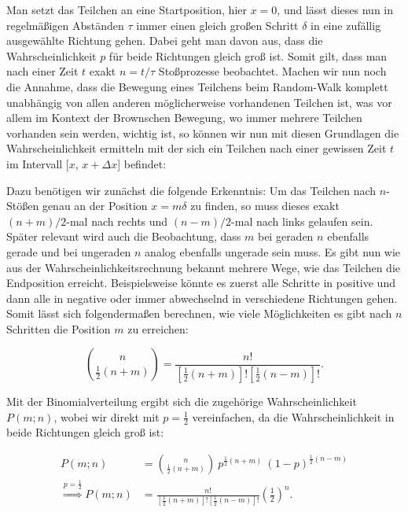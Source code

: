 \documentclass{article}
\begin{document}
Man setzt das Teilchen an eine Startposition, hier $x = 0$, und lässt dieses nun in regelmäßigen Abständen $\tau$ immer einen gleich großen Schritt $\delta$ in eine zufällig ausgewählte Richtung gehen. Dabei geht man davon aus, dass die Wahrscheinlichkeit $p$ für beide Richtungen gleich groß ist. Somit gilt, dass man nach einer Zeit $t$ exakt $n = t/\tau$ Stoßprozesse beobachtet. Machen wir nun noch die Annahme, dass die Bewegung eines Teilchens beim Random-Walk komplett unabhängig von allen anderen möglicherweise vorhandenen Teilchen ist, was vor allem im Kontext der Brownschen Bewegung, wo immer mehrere Teilchen vorhanden sein werden, wichtig ist, so können wir nun mit diesen Grundlagen die Wahrscheinlichkeit ermitteln mit der sich ein Teilchen nach einer gewissen Zeit $t$ im Intervall [$x$, $x+\Delta x$] befindet:

Dazu benötigen wir zunächst die folgende Erkenntnis: Um das Teilchen nach $n$-Stößen genau an der Position $x = m \delta$ zu finden, so muss dieses exakt $(n+m)/2$-mal nach rechts und $(n-m)/2$-mal nach links gelaufen sein. Später relevant wird auch die Beobachtung, dass $m$ bei geraden $n$ ebenfalls gerade und bei ungeraden $n$ analog ebenfalls ungerade sein muss. 
Es gibt nun wie aus der Wahrscheinlichkeitsrechnung bekannt mehrere Wege, wie das Teilchen die Endposition erreicht. Beispielsweise könnte es zuerst alle Schritte in positive und dann alle in negative oder immer abwechselnd in verschiedene Richtungen gehen. Somit lässt sich folgendermaßen berechnen, wie viele Möglichkeiten es gibt nach $n$ Schritten die Position $m$ zu erreichen:

\begin{equation}
    \binom{n}{\frac{1}{2}(n+m)} = \frac{n!}{[\frac{1}{2}(n+m)]! [\frac{1}{2}(n-m)]!}.
\end{equation}

Mit der Binomialverteilung ergibt sich die zugehörige Wahrscheinlichkeit $P(m;n)$, wobei wir direkt mit $p=\frac{1}{2}$ vereinfachen, da die Wahrscheinlichkeit in beide Richtungen gleich groß ist:

\begin{equation}
    \begin{split}
        P(m;n) &= \binom{n}{\frac{1}{2}(n+m)} \ p^{\frac{1}{2}(n+m)} \ (1-p)^{\frac{1}{2}(n-m)} \\
        \overset{p = \frac{1}{2}}{\Rightarrow} P(m;n) &= \frac{n!}{[\frac{1}{2}(n+m)]! [\frac{1}{2}(n-m)]!} \left( \frac{1}{2} \right)^n.
    \end{split}
\end{equation}
\end{document}
